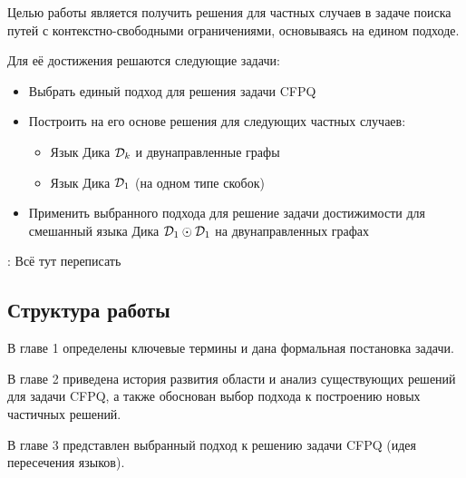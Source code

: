 Целью работы является получить решения для частных случаев в задаче поиска путей с контекстно-свободными ограничениями, основываясь на едином подходе.

Для её достижения решаются следующие задачи:
    \begin{itemize}
      \item Выбрать единый подход для решения задачи CFPQ
      \item Построить на его основе решения для следующих частных случаев:
        \begin{itemize}
          \item Язык Дика $\mathcal{D}_k$ и двунаправленные графы
          \item Язык Дика $\mathcal{D}_1$ (на одном типе скобок)
        \end{itemize}
      \item Применить выбранного подхода для решение задачи достижимости для смешанный языка Дика $\mathcal{D}_1 \odot \mathcal{D}_1$ на двунаправленных графах
    \end{itemize}

\TODO: Всё тут переписать

\subsection*{Структура работы}

В главе 1 определены ключевые термины и дана формальная постановка задачи.

В главе 2 приведена история развития области и анализ существующих решений для задачи CFPQ, а также обоснован выбор подхода к построению новых частичных решений.

В главе 3 представлен выбранный подход к решению задачи CFPQ (идея пересечения языков).

\TODO